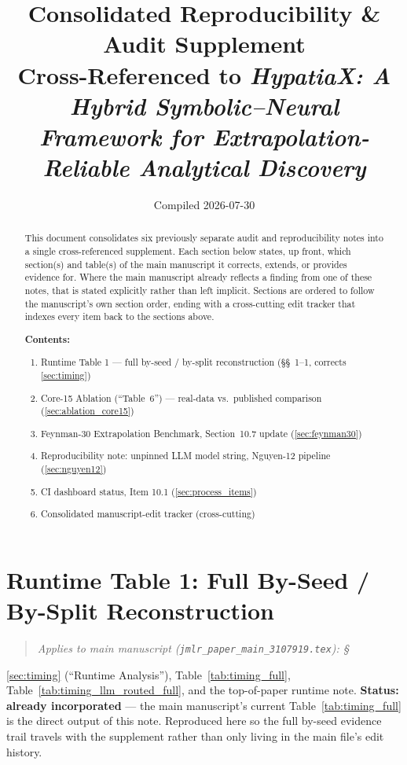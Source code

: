 \documentclass[11pt]{article}
\title{\bf Consolidated Reproducibility \& Audit Supplement\\
\large Cross-Referenced to \emph{HypatiaX: A Hybrid Symbolic--Neural
Framework for Extrapolation-Reliable Analytical Discovery}}
\author{}
\date{Compiled 2026-07-30}
\newenvironment{appliesto}[1]
  {\begin{quote}\small\itshape\noindent Applies to main manuscript
    (\texttt{jmlr\_paper\_main\_3107919.tex}): #1\end{quote}}
  {}
\begin{document}
\maketitle
\thispagestyle{empty}

\begin{abstract}
This document consolidates six previously separate audit and
reproducibility notes into a single cross-referenced supplement. Each
section below states, up front, which section(s) and table(s) of the
main manuscript it corrects, extends, or provides evidence for. Where
the main manuscript already reflects a finding from one of these notes,
that is stated explicitly rather than left implicit. Sections are
ordered to follow the manuscript's own section order, ending with a
cross-cutting edit tracker that indexes every item back to the sections
above.

\medskip
\noindent\textbf{Contents:}
\begin{enumerate}[nosep]
\item Runtime Table 1 --- full by-seed / by-split reconstruction
  (\S\S~1--1, corrects \ref{sec:timing})
\item Core-15 Ablation (``Table~6'') --- real-data vs.\ published
  comparison (\ref{sec:ablation_core15})
\item Feynman-30 Extrapolation Benchmark, Section~10.7 update
  (\ref{sec:feynman30})
\item Reproducibility note: unpinned LLM model string, Nguyen-12 pipeline
  (\ref{sec:nguyen12})
\item CI dashboard status, Item 10.1 (\ref{sec:process_items})
\item Consolidated manuscript-edit tracker (cross-cutting)
\end{enumerate}
\end{abstract}

\clearpage

\section{Runtime Table 1: Full By-Seed / By-Split Reconstruction}
\label{supp:runtime}

\begin{appliesto}
\S\ref{sec:timing} (``Runtime Analysis''), Table~\ref{tab:timing_full},
Table~\ref{tab:timing_llm_routed_full}, and the top-of-paper runtime note.
\textbf{Status: already incorporated} --- the main manuscript's current
Table~\ref{tab:timing_full} is the direct output of this note. Reproduced
here so the full by-seed evidence trail travels with the supplement
rather than only living in the main file's edit history.
\end{appliesto}
\end{document}
